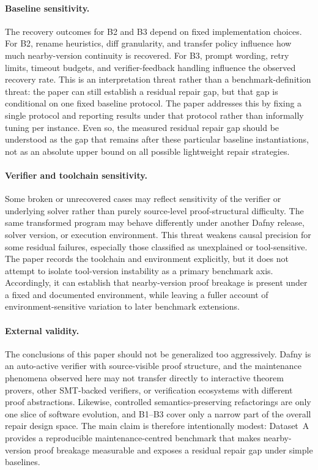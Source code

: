 \paragraph{Baseline sensitivity.}
The recovery outcomes for B2 and B3 depend on fixed implementation choices. For B2, rename heuristics, diff granularity, and transfer policy influence how much nearby-version continuity is recovered. For B3, prompt wording, retry limits, timeout budgets, and verifier-feedback handling influence the observed recovery rate. This is an interpretation threat rather than a benchmark-definition threat: the paper can still establish a residual repair gap, but that gap is conditional on one fixed baseline protocol. The paper addresses this by fixing a single protocol and reporting results under that protocol rather than informally tuning per instance. Even so, the measured residual repair gap should be understood as the gap that remains after these particular baseline instantiations, not as an absolute upper bound on all possible lightweight repair strategies.

\paragraph{Verifier and toolchain sensitivity.}
Some broken or unrecovered cases may reflect sensitivity of the verifier or underlying solver rather than purely source-level proof-structural difficulty. The same transformed program may behave differently under another Dafny release, solver version, or execution environment. This threat weakens causal precision for some residual failures, especially those classified as unexplained or tool-sensitive. The paper records the toolchain and environment explicitly, but it does not attempt to isolate tool-version instability as a primary benchmark axis. Accordingly, it can establish that nearby-version proof breakage is present under a fixed and documented environment, while leaving a fuller account of environment-sensitive variation to later benchmark extensions.

\paragraph{External validity.}
The conclusions of this paper should not be generalized too aggressively. Dafny is an auto-active verifier with source-visible proof structure, and the maintenance phenomena observed here may not transfer directly to interactive theorem provers, other SMT-backed verifiers, or verification ecosystems with different proof abstractions. Likewise, controlled semantics-preserving refactorings are only one slice of software evolution, and B1--B3 cover only a narrow part of the overall repair design space. The main claim is therefore intentionally modest: Dataset~A provides a reproducible maintenance-centred benchmark that makes nearby-version proof breakage measurable and exposes a residual repair gap under simple baselines.
